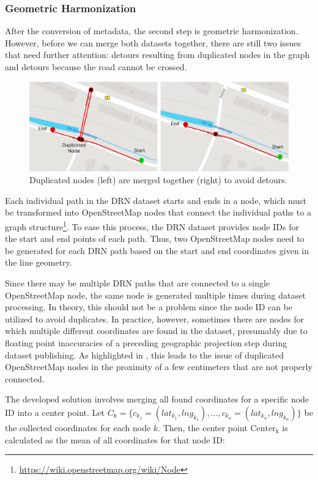 \subsubsection{Geometric Harmonization}

After the conversion of metadata, the second step is geometric harmonization. However, before we can merge both datasets together, there are still two issues that need further attention: detours resulting from duplicated nodes in the graph and detours because the road cannot be crossed. 

\begin{figure}[ht]
\centering
\includegraphics[width=\linewidth]{images/node-merging.png}
\caption{Duplicated nodes (left) are merged together (right) to avoid detours.}
\label{fig:node-merging}
\end{figure}

Each individual path in the DRN dataset starts and ends in a node, which must be transformed into OpenStreetMap nodes that connect the individual paths to a graph structure\footnote{\url{https://wiki.openstreetmap.org/wiki/Node}}. To ease this process, the DRN dataset provides node IDs for the start and end points of each path. Thus, two OpenStreetMap nodes need to be generated for each DRN path based on the start and end coordinates given in the line geometry. 

Since there may be multiple DRN paths that are connected to a single OpenStreetMap node, the same node is generated multiple times during dataset processing. In theory, this should not be a problem since the node ID can be utilized to avoid duplicates. In practice, however, sometimes there are nodes for which multiple different coordinates are found in the dataset, presumably due to floating point inaccuracies of a preceding geographic projection step during dataset publishing. As highlighted in , this leads to the issue of duplicated OpenStreetMap nodes in the proximity of a few centimeters that are not properly connected.

The developed solution involves merging all found coordinates for a specific node ID into a center point. Let $C_k = \{c_{k_1} = (lat_{k_1}, lng_{k_1}), \text{...} , c_{k_n} = (lat_{k_n}, lng_{k_n})\}$ be the collected coordinates for each node $k$. Then, the center point $\text{Center}_{\text{k}}$ is calculated as the mean of all coordinates for that node ID:

